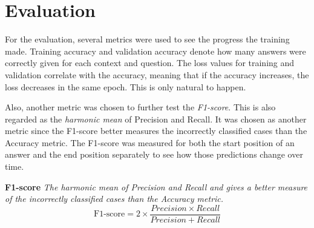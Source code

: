     \section{Evaluation}
    \label{sec:evaluation}

        For the evaluation, several metrics were used to see the progress the training made. Training accuracy and validation accuracy denote how many answers were correctly given for each context and question. The loss values for training and validation correlate with the accuracy, meaning that if the accuracy increases, the loss decreases in the same epoch. This is only natural to happen.
        
        Also, another metric was chosen to further test the \emph{F1-score}. This is also regarded as the \emph{harmonic mean} of Precision and Recall. It was chosen as another metric since the F1-score better measures the incorrectly classified cases than the Accuracy metric. 
        The F1-score was measured for both the start position of an answer and the end position separately to see how those predictions change over time.

        \begin{tcolorbox}
            \textbf{F1-score}
            \textit{The harmonic mean of Precision and Recall and gives a better measure of the incorrectly classified cases than the Accuracy metric.}
            $$\text{F1-score} = 2 \times \frac{Precision \times Recall}{Precision + Recall}$$
        \end{tcolorbox}
   

